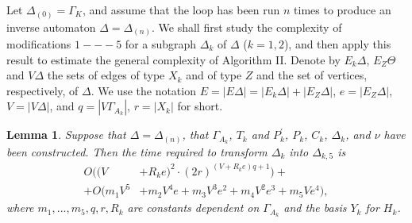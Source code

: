 \documentclass[a4paper,12pt]{article}
\newcommand{\G}{\Gamma }
\newcommand{\D}{\Delta }
\newcommand{\T}{\Theta }
\newtheorem{lemma}[theorem]{Lemma}
\numberwithin{equation}{section}
\numberwithin{figure}{section}
\begin{document}
Let $\D_{(0)} = \G_K$,
 and assume that the loop has been run $n$ times to produce an
inverse automaton $\D=\D_{(n)}$.
We shall
first study  the complexity of modifications $1 --- 5$ for a subgraph $\D_k$ of $\D$ ($k=1,2$), and then apply this result
to estimate the general complexity of Algorithm II. Denote by $E_k
\D$, $E_Z \T$ and $V\D$ the sets of edges of type $X_k$ and of
type $Z$ and the set of vertices, respectively, of  $\D$.
 We use the notation $E = |E \D| =
|E_k \D| + |E_Z \D|$, $e = |E_Z \D|$, $V = |V \D|$, and $q = |V
\G_{A_k}|$, $r = |X_k|$ for short.


\begin{lemma}\label{lem:resolution} Suppose that $\D = \D_{(n)}$,
that $\G_{A_k}$, $T_k$ and $P_k^\prime$, $P_k$,  $C_k$, $\D_k$, and $\nu$  have been
constructed. Then the time required to transform $\D_k$ into $\D_{k,5}$ is
\[\begin{split}
O((V &+R_k e)^2\cdot (2r)^{(V + R_k e) q +1})+\\
+O(m_1 V^5 &+ m_2V^4 e +m_3 V^3 e^2 +m_4 V^2 e^3 + m_5 V e^4),
\end{split}
\]
where $m_1, \ldots, m_5, q, r,  R_k $ are constants dependent on
$\G_{A_k}$ and the basis $Y_k$ for $H_k$.

%



%
\end{lemma}
\end{document}
